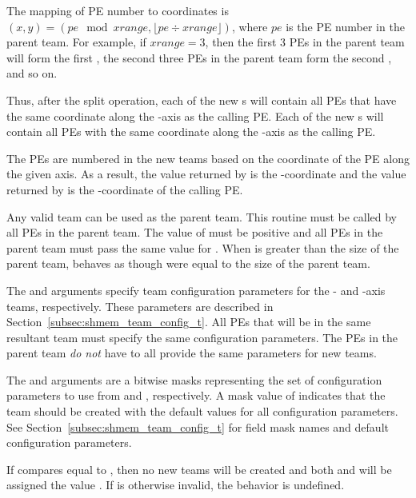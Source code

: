 \begin{apidefinition}
{The mapping of \ac{PE} number to coordinates is $(x, y) = ( pe \mod xrange, \lfloor pe \div xrange \rfloor )$,
where $pe$ is the \ac{PE} number in the parent team. For example, if $xrange = 3$,
then the first 3 \acp{PE} in the parent team will form the first
, the second three \acp{PE} in the parent team form the second ,
and so on.

Thus, after the split operation, each of the new s will contain all \acp{PE} that
have the same coordinate along the -axis as the calling \ac{PE}. Each of the
new s will contain all \acp{PE} with the same coordinate along the
-axis as the calling \ac{PE}.

The \acp{PE} are numbered in the new teams based on the coordinate of the
\ac{PE} along the given axis. As a result,
the value returned by  is the
-coordinate and the value returned by 
is the -coordinate of the calling \ac{PE}.

Any valid \openshmem team can be used as the parent team. This routine must be
called by all \acp{PE} in the parent team. The value of  must be
positive and all \acp{PE} in the parent team must pass the same value for
.  When  is greater than the size of the parent team,
 behaves as though  were equal to the
size of the parent team.

The  and  arguments specify team
configuration parameters for the - and -axis teams, respectively.
These parameters are described in Section~\ref{subsec:shmem_team_config_t}.
All \acp{PE} that will be in the same resultant team must specify the same
configuration parameters.
The \acp{PE} in the parent team \emph{do not} have to all provide the same
parameters for new teams.

The  and  arguments are a bitwise masks
representing the set of configuration parameters to use from
 and , respectively.
A mask value of  indicates that the team
should be created with the default values for all configuration parameters.
See Section~\ref{subsec:shmem_team_config_t} for field mask names and
default configuration parameters.

If  compares equal to
, then no new teams will be created
and both  and  will be assigned the
value .
If  is otherwise invalid, the behavior is undefined.

}
\end{apidefinition}
